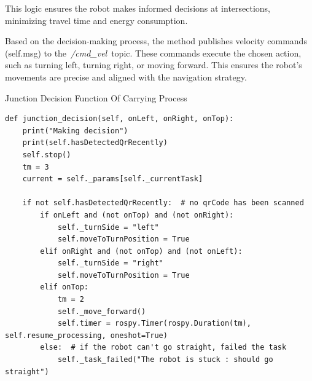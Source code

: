 \documentclass[../../main]{subfiles}
\begin{document}
This logic ensures the robot makes informed decisions at intersections,
minimizing travel time and energy consumption.

Based on the decision-making process, the method publishes velocity
commands (self.msg) to the~\emph{/cmd\_vel}~topic. These commands
execute the chosen action, such as turning left, turning right, or
moving forward. This ensures the robot's movements are precise and
aligned with the navigation strategy.

\begin{codebox}[label=judeFig37]{Junction Decision Function Of Carrying Process}
\begin{verbatim}
def junction_decision(self, onLeft, onRight, onTop):
    print("Making decision")
    print(self.hasDetectedQrRecently)
    self.stop()
    tm = 3
    current = self._params[self._currentTask]
        
    if not self.hasDetectedQrRecently:  # no qrCode has been scanned
        if onLeft and (not onTop) and (not onRight): 
            self._turnSide = "left"
            self.moveToTurnPosition = True
        elif onRight and (not onTop) and (not onLeft): 
            self._turnSide = "right"
            self.moveToTurnPosition = True
        elif onTop: 
            tm = 2
            self._move_forward()        
            self.timer = rospy.Timer(rospy.Duration(tm), self.resume_processing, oneshot=True)
        else:  # if the robot can't go straight, failed the task
            self._task_failed("The robot is stuck : should go straight")
   

\end{verbatim}
\end{codebox}
\end{document}
